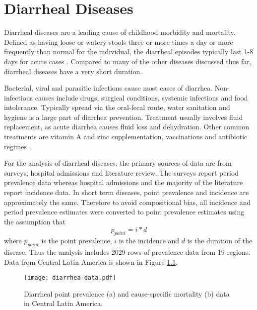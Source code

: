 \chapter{Diarrheal Diseases}
\label{applications-short_dur}

Diarrheal diseases are a leading cause of childhood morbidity and mortality.  Defined as having loose or watery stools three or more times a day or more frequently than normal for the individual, the diarrheal episodes typically last 1-8 days for acute cases \cite{unicef_diarrhoea_2009, carlos_etiology_1990, lamberti_systematic_2012}.  Compared to many of the other diseases discussed thus far, diarrheal diseases have a very short duration.

Bacterial, viral and parasitic infections cause most cases of diarrhea.  Non-infectious causes include drugs, surgical conditions, systemic infections and food intolerance.  Typically spread via the oral-fecal route, water sanitation and hygiene is a large part of diarrhea prevention.  Treatment usually involves fluid replacement, as acute diarrhea causes fluid loss and dehydration.  Other common treatments are vitamin A and zinc supplementation, vaccinations and antibiotic regimes \cite{unicef_diarrhoea_2009, carlos_etiology_1990, lamberti_systematic_2012}.

For the analysis of diarrheal diseases, the primary sources of data are from surveys, hospital admissions and literature review.  The surveys report period prevalence data whereas hospital admissions and the majority of the literature report incidence data.  In short term diseases, point prevalence and incidence are approximately the same.  Therefore to avoid compositional bias, all incidence and period prevalence estimates were converted to point prevalence estimates using the assumption that
    \begin{equation}
    	p_{point}=i*d
    \end{equation}
where $p_{point}$ is the point prevalence, $i$ is the incidence and $d$ is the duration of the disease.  Thus the analysis includes 2029 rows of prevalence data from 19 regions.  Data from Central Latin America is shown in Figure \ref{fig:app-diarrhea data}.

    \begin{figure}[h]
        \begin{center}
            \texttt{[image: diarrhea-data.pdf]}
            \caption{Diarrheal point prevalence (a) and cause-specific mortality (b) data in Central Latin America.}
            \label{fig:app-diarrhea data}
        \end{center}
    \end{figure}

